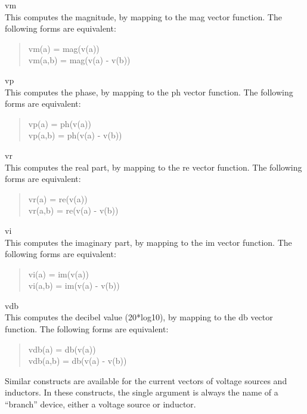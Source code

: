 \begin{description}
\item{\vt vm}\\
This computes the magnitude, by mapping to the {\vt mag} vector
function.  The following forms are equivalent:
\begin{quote}\vt
vm(a) = mag(v(a))\\
vm(a,b) = mag(v(a) - v(b))
\end{quote}

\item{\vt vp}\\
This computes the phase, by mapping to the {\vt ph} vector
function.  The following forms are equivalent:
\begin{quote}\vt
vp(a) = ph(v(a))\\
vp(a,b) = ph(v(a) - v(b))
\end{quote}

\item{\vt vr}\\
This computes the real part, by mapping to the {\vt re} vector
function.  The following forms are equivalent:
\begin{quote}\vt
vr(a) = re(v(a))\\
vr(a,b) = re(v(a) - v(b))
\end{quote}

\item{\vt vi}\\
This computes the imaginary part, by mapping to the {\vt im} vector
function.  The following forms are equivalent:
\begin{quote}\vt
vi(a) = im(v(a))\\
vi(a,b) = im(v(a) - v(b))
\end{quote}

\item{\vt vdb}\\
This computes the decibel value (20*log10), by mapping to the
{\vt db} vector function.  The following forms are equivalent:
\begin{quote}\vt
vdb(a) = db(v(a))\\
vdb(a,b) = db(v(a) - v(b))
\end{quote}
\end{description}

Similar constructs are available for the current vectors of voltage
sources and inductors.  In these constructs, the single argument is
always the name of a ``branch'' device, either a voltage source or
inductor.

